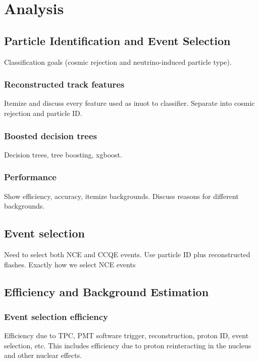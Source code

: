 \section{Analysis}\label{analysis}
\hspace{\parindent}

\subsection{Particle Identification and Event Selection}
  Classification goals (cosmic rejection and neutrino-induced particle type).
  \subsubsection{Reconstructed track features}
    Itemize and discuss every feature used as inuot to classifier.
    Separate into cosmic rejection and particle ID.
  \subsubsection{Boosted decision trees}
    Decision trees, tree boosting, xgboost.
  \subsubsection{Performance}
    Show efficiency, accuracy, itemize backgrounds.
    Discuss reasons for different backgrounds.
  \subsection{Event selection}
    Need to select both NCE and CCQE events.
    Use particle ID plus reconstructed flashes.
    Exactly how we select NCE events 

\subsection{Efficiency and Background Estimation}\label{background}
  \subsubsection{Event selection efficiency}
    Efficiency due to TPC, PMT software trigger, reconstruction, proton ID,
    event selection, etc. This includes efficiency due to proton reinteracting
    in the nucleus and other nuclear effects.
